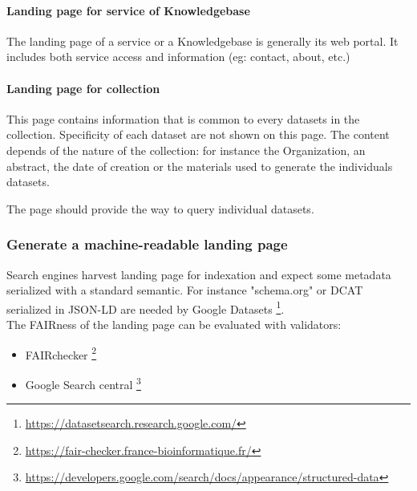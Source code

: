 \documentclass[11pt,a4paper]{ivoa}
\begin{document}
\paragraph{Landing page for service of Knowledgebase}
The landing page of a service or a Knowledgebase is generally its web portal. It includes both service access and information (eg: contact, about, etc.)

\paragraph{Landing page for collection}
This page contains information that is common to every datasets in the collection. Specificity of each dataset are not shown on this page. The content depends of the nature of the collection: for instance the Organization, an abstract, the date of creation or the materials used to generate the individuals datasets.

The page should provide the way to query individual datasets.

\subsubsection{Generate a machine-readable landing page}
Search engines harvest landing page for indexation and expect some metadata serialized with a standard semantic. For instance "schema.org" or DCAT serialized in JSON-LD are needed by Google Datasets \footnote{\url{https://datasetsearch.research.google.com/}}.\\


The FAIRness of the landing page can be evaluated with validators:
\begin{itemize}
    \item FAIRchecker \footnote{\url{https://fair-checker.france-bioinformatique.fr/}}
    \item Google Search central \footnote{\url{https://developers.google.com/search/docs/appearance/structured-data}}
\end{itemize}
\end{document}
